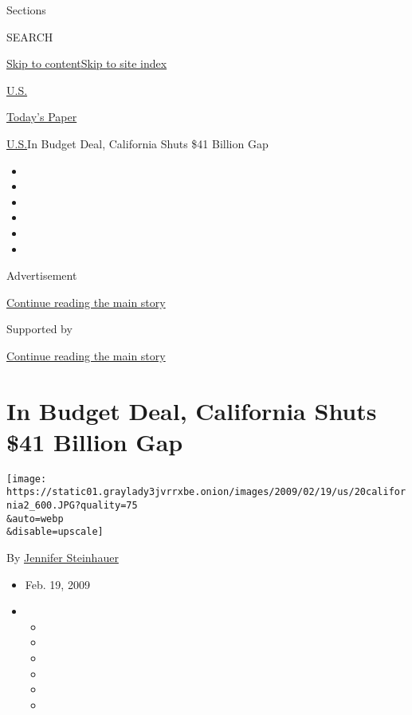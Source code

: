 Sections

SEARCH

\protect\hyperlink{site-content}{Skip to
content}\protect\hyperlink{site-index}{Skip to site index}

\href{https://www.nytimes3xbfgragh.onion/section/us}{U.S.}

\href{https://myaccount.nytimes3xbfgragh.onion/auth/login?response_type=cookie\&client_id=vi}{}

\href{https://www.nytimes3xbfgragh.onion/section/todayspaper}{Today's
Paper}

\href{/section/us}{U.S.}\textbar{}In Budget Deal, California Shuts \$41
Billion Gap

\begin{itemize}
\item
\item
\item
\item
\item
\item
\end{itemize}

Advertisement

\protect\hyperlink{after-top}{Continue reading the main story}

Supported by

\protect\hyperlink{after-sponsor}{Continue reading the main story}

\hypertarget{in-budget-deal-california-shuts-41-billion-gap}{%
\section{In Budget Deal, California Shuts \$41 Billion
Gap}\label{in-budget-deal-california-shuts-41-billion-gap}}

\texttt{[image: https://static01.graylady3jvrrxbe.onion/images/2009/02/19/us/20california2\_600.JPG?quality=75\\\&auto=webp\\\&disable=upscale]}

By
\href{https://www.nytimes3xbfgragh.onion/by/jennifer-steinhauer}{Jennifer
Steinhauer}

\begin{itemize}
\item
  Feb. 19, 2009
\item
  \begin{itemize}
  \item
  \item
  \item
  \item
  \item
  \item
  \end{itemize}
\end{itemize}

